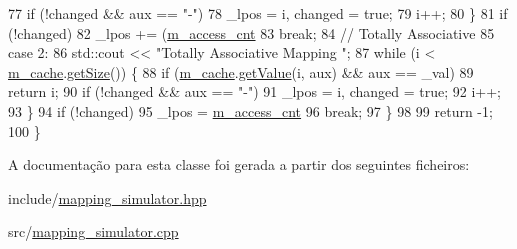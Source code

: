 \begin{DoxyCode}
77                 \textcolor{keywordflow}{if} (!changed && aux == \textcolor{stringliteral}{"-"})
78                     \_lpos = i, changed = \textcolor{keyword}{true};
79                 i++;
80             \}
81             \textcolor{keywordflow}{if} (!changed)
82                 \_lpos += (\hyperlink{classMappingSimulator_a8ab92a05774ab4a3ca35e2f299f58fc6}{m\_access\_cnt} %
83             \textcolor{keywordflow}{break};
84         \textcolor{comment}{// Totally Associative}
85         \textcolor{keywordflow}{case} 2:
86             std::cout << \textcolor{stringliteral}{"Totally Associative Mapping "};
87             \textcolor{keywordflow}{while} (i < \hyperlink{classMappingSimulator_a5a8a438a167ea70c9aee70635d0ae06a}{m\_cache}.\hyperlink{classCache_aeba1d1861c728efecdf8774de51c77d0}{getSize}()) \{
88                 \textcolor{keywordflow}{if} (\hyperlink{classMappingSimulator_a5a8a438a167ea70c9aee70635d0ae06a}{m\_cache}.\hyperlink{classCache_a6cae76d581d7c6c655652ed8c7a5afca}{getValue}(i, aux) && aux == \_val)
89                     \textcolor{keywordflow}{return} i;
90                 \textcolor{keywordflow}{if} (!changed && aux == \textcolor{stringliteral}{"-"})
91                     \_lpos = i, changed = \textcolor{keyword}{true};
92                 i++;
93             \}
94             \textcolor{keywordflow}{if} (!changed)
95                 \_lpos = \hyperlink{classMappingSimulator_a8ab92a05774ab4a3ca35e2f299f58fc6}{m\_access\_cnt} %
96             \textcolor{keywordflow}{break};
97     \}
98 
99     \textcolor{keywordflow}{return} -1;
100 \}
\end{DoxyCode}


A documentação para esta classe foi gerada a partir dos seguintes ficheiros\+:\begin{DoxyCompactItemize}
\item 
include/\hyperlink{mapping__simulator_8hpp}{mapping\+\_\+simulator.\+hpp}\item 
src/\hyperlink{mapping__simulator_8cpp}{mapping\+\_\+simulator.\+cpp}\end{DoxyCompactItemize}
